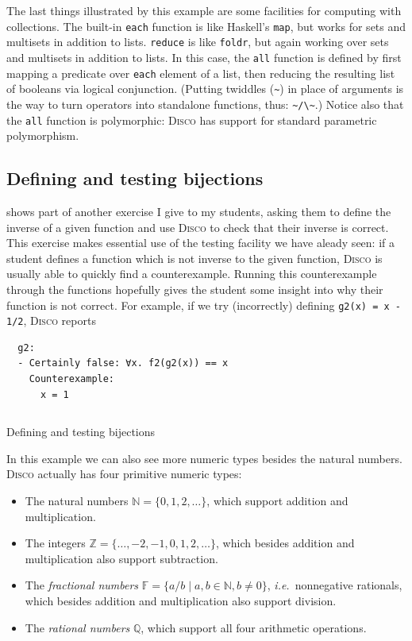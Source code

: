 \documentclass[submission,copyright,creativecommons]{eptcs}
\newcommand{\disco}{\textsc{Disco}\xspace}
\newcommand{\ie}{\emph{i.e.}\ }
\newcommand{\pref}[1]{\prettyref{#1}}
\newcommand{\N}{\mathbb{N}}
\newcommand{\Z}{\mathbb{Z}}
\newcommand{\F}{\mathbb{F}}
\newcommand{\Q}{\mathbb{Q}}
\begin{document}
The last things illustrated by this example are some facilities for
computing with collections.  The built-in \texttt{each} function is
like Haskell's \texttt{map}, but works for sets and multisets in
addition to lists.  \texttt{reduce} is like \texttt{foldr}, but again
working over sets and multisets in addition to lists.  In this case,
the \texttt{all} function is defined by first mapping a predicate over
\texttt{each} element of a list, then reducing the resulting list of
booleans via logical conjunction.  (Putting twiddles (\verb|~|) in
place of arguments is the way to turn operators into standalone
functions, thus: \verb|~/\~|.)  Notice also that the \texttt{all}
function is polymorphic: \disco has support for standard parametric
polymorphism.

\subsection{Defining and testing bijections}

\pref{lst:bijection} shows part of another exercise I give to my
students, asking them to define the inverse of a given function and
use \disco to check that their inverse is correct.  This exercise makes
essential use of the testing facility we have aleady seen: if a
student defines a function which is not inverse to the given function,
\disco is usually able to quickly find a counterexample.  Running
this counterexample through the functions hopefully gives the student
some insight into why their function is not correct.  For example, if
we try (incorrectly) defining \texttt{g2(x) = x - 1/2}, \disco reports
\begin{verbatim}
  g2:
  - Certainly false: ∀x. f2(g2(x)) == x
    Counterexample:
      x = 1
\end{verbatim}

\begin{listing}
  \inputminted{text}{examples/bijection.disco}
  \caption{Defining and testing bijections}
  \label{lst:bijection}
\end{listing}

In this example we can also see more numeric types besides the natural
numbers.  \disco actually has four primitive numeric types:
\begin{itemize}
\item The natural numbers $\N = \{0, 1, 2, \dots\}$, which support
  addition and multiplication.
\item The integers $\Z = \{\dots, -2, -1, 0, 1, 2, \dots\}$, which
  besides addition and multiplication also support subtraction.
\item The \emph{fractional numbers} $\F = \{ a/b \mid a, b \in \N, b
  \neq 0 \}$, \ie nonnegative rationals, which besides addition and
  multiplication also support division.
\item The \emph{rational numbers} $\Q$, which support all four
  arithmetic operations.
\end{itemize}
\end{document}
